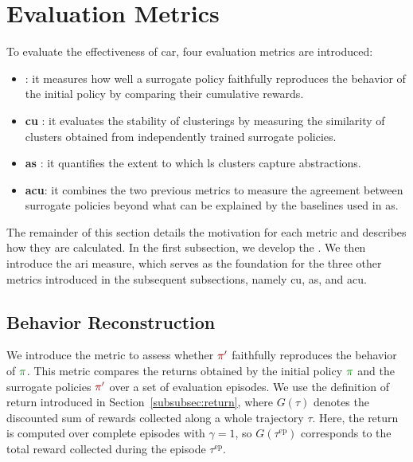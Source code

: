 \section{Evaluation Metrics}
\label{sec:clustering_agent_representations_evaluation_metrics}

To evaluate the effectiveness of \gls{car}, four evaluation metrics are introduced:

\begin{itemize}
    \item \textbf{\BehaviorReconstructionName} : it measures how well a surrogate policy faithfully reproduces the behavior of the initial policy by comparing their cumulative rewards.
    \item \textbf{\gls{cu}} : it evaluates the stability of clusterings by measuring the similarity of clusters obtained from independently trained surrogate policies.
    \item \textbf{\gls{as}} : it quantifies the extent to which \gls{ls} clusters capture abstractions.
    \item \textbf{\gls{acu}}: it combines the two previous metrics to measure the agreement between surrogate policies beyond what can be explained by the baselines used in \gls{as}.
\end{itemize}

The remainder of this section details the motivation for each metric and describes how they are calculated.
In the first subsection, we develop the \BehaviorReconstructionName{}.
We then introduce the \gls{ari} measure, which serves as the foundation for the three other metrics introduced in the subsequent subsections, namely \gls{cu}, \gls{as}, and \gls{acu}.

\subsection{Behavior Reconstruction}

We introduce the \BehaviorReconstructionName metric to assess whether $\SurrogatePolicy{}$ faithfully reproduces the behavior of $\InitialPolicy$.
This metric compares the returns obtained by the initial policy $\InitialPolicy$ and the surrogate policies $\SurrogatePolicy{}$ over a set of evaluation episodes.
We use the definition of return introduced in Section~\ref{subsubsec:return}, where $G(\tau)$ denotes the discounted sum of rewards collected along a whole trajectory $\tau$.
Here, the return is computed over complete episodes with $\gamma=1$, so $G(\tau^{\mathrm{ep}})$ corresponds to the total reward collected during the episode $\tau^{\mathrm{ep}}$.

